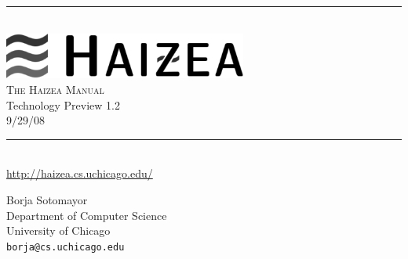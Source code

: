 \newcommand{\HRule}{\rule{\linewidth}{0.5mm}}

\begin{titlepage}
 
\begin{center}
 
\HRule \\[0.4cm]
\includegraphics[width=0.6\textwidth]{images/haizea.png}\\[1cm]
\textsc{ \huge The Haizea Manual}\\{\large Technology Preview 1.2}\\{\large 9/29/08}\\[0.4cm]
 
\HRule \\[1.5cm]
\url{http://haizea.cs.uchicago.edu/}

\vfill
 
\begin{flushright} \large
Borja Sotomayor\\
Department of Computer Science\\
University of Chicago\\
\texttt{borja@cs.uchicago.edu}
\end{flushright}
 
\end{center}
 
\end{titlepage}
